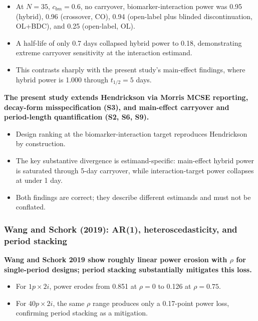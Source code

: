 \documentclass[
  11pt,
]{article}
\begin{document}
\begin{itemize}\setlength{\itemsep}{2pt}\setlength{\parskip}{0pt}
\item At $N = 35$, $c_{bm} = 0.6$, no carryover, biomarker-interaction power was 0.95 (hybrid), 0.96 (crossover, CO), 0.94 (open-label plus blinded discontinuation, OL+BDC), and 0.25 (open-label, OL).
\item A half-life of only 0.7 days collapsed hybrid power to 0.18, demonstrating extreme carryover sensitivity at the interaction estimand.
\item This contrasts sharply with the present study's main-effect findings, where hybrid power is 1.000 through $t_{1/2} = 5$ days.
\end{itemize}

\textbf{The present study extends Hendrickson via Morris MCSE reporting, decay-form misspecification (S3), and main-effect carryover and period-length quantification (S2, S6, S9).}

\begin{itemize}\setlength{\itemsep}{2pt}\setlength{\parskip}{0pt}
\item Design ranking at the biomarker-interaction target reproduces Hendrickson by construction.
\item The key substantive divergence is estimand-specific: main-effect hybrid power is saturated through 5-day carryover, while interaction-target power collapses at under 1 day.
\item Both findings are correct; they describe different estimands and must not be conflated.
\end{itemize}

\subsubsection{Wang and Schork (2019): AR(1), heteroscedasticity, and period stacking}\label{wang-and-schork-2019-ar1-heteroscedasticity-and-period-stacking}

\textbf{Wang and Schork 2019 show roughly linear power erosion with $\rho$ for single-period designs; period stacking substantially mitigates this loss.}

\begin{itemize}\setlength{\itemsep}{2pt}\setlength{\parskip}{0pt}
\item For $1p \times 2i$, power erodes from 0.851 at $\rho = 0$ to 0.126 at $\rho = 0.75$.
\item For $40p \times 2i$, the same $\rho$ range produces only a 0.17-point power loss, confirming period stacking as a mitigation.
\end{itemize}
\end{document}
